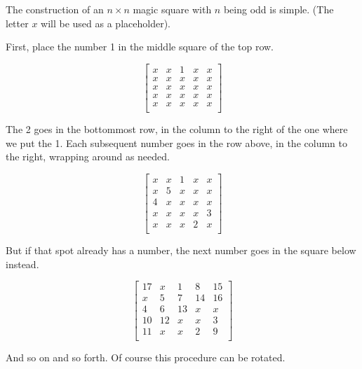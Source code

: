 \documentclass[12pt]{article}
\begin{document}
The construction of an $n \times n$ magic square with $n$ being odd is simple. (The letter $x$ will be used as a placeholder).

First, place the number 1 in the middle square of the top row.

$$\begin{bmatrix}
x & x & 1 & x & x \\
x & x & x & x & x \\
x & x & x & x & x \\
x & x & x & x & x \\
x & x & x & x & x \\
\end{bmatrix}$$

The 2 goes in the bottommost row, in the column to the right of the one where we put the 1. Each subsequent number goes in the row above, in the column to the right, wrapping around as needed.

$$\begin{bmatrix}
x & x & 1 & x & x \\
x & 5 & x & x & x \\
4 & x & x & x & x \\
x & x & x & x & 3 \\
x & x & x & 2 & x \\
\end{bmatrix}$$

But if that spot already has a number, the next number goes in the square below instead.

$$\begin{bmatrix}
17 & x & 1 & 8 & 15 \\
x & 5 & 7 & 14 & 16 \\
4 & 6 & 13 & x & x \\
10 & 12 & x & x & 3 \\
11 & x & x & 2 & 9 \\
\end{bmatrix}$$

And so on and so forth. Of course this procedure can be rotated.
\end{document}
